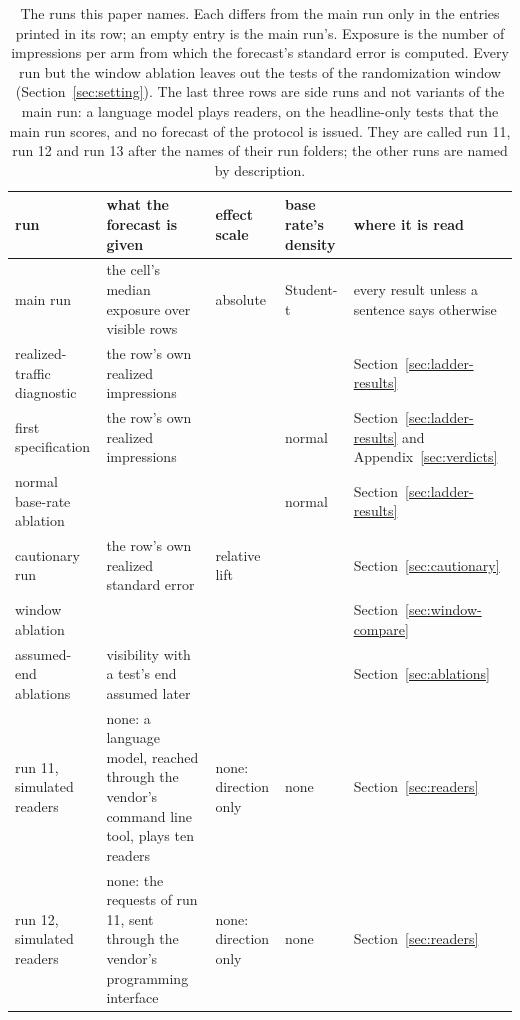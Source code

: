 \documentclass[sigconf,nonacm]{acmart}
\begin{document}
\begin{table}[t]\centering\scriptsize
\caption{The runs this paper names. Each differs from the main run only in the entries printed in its row; an empty entry is the main run's. Exposure is the number of impressions per arm from which the forecast's standard error is computed. Every run but the window ablation leaves out the tests of the randomization window (Section~\ref{sec:setting}). The last three rows are side runs and not variants of the main run: a language model plays readers, on the headline-only tests that the main run scores, and no forecast of the protocol is issued. They are called run 11, run 12 and run 13 after the names of their run folders; the other runs are named by description.}
\label{tab:fmt-runs}
\begin{tabular}{p{}p{}p{}p{}p{}}
\toprule
run & what the forecast is given & effect scale & base rate's density & where it is read \\
\midrule
main run & the cell's median exposure over visible rows & absolute & Student-t & every result unless a sentence says otherwise \\
realized-traffic diagnostic & the row's own realized impressions & & & Section~\ref{sec:ladder-results} \\
first specification & the row's own realized impressions & & normal & Section~\ref{sec:ladder-results} and Appendix~\ref{sec:verdicts} \\
normal base-rate ablation & & & normal & Section~\ref{sec:ladder-results} \\
cautionary run & the row's own realized standard error & relative lift & & Section~\ref{sec:cautionary} \\
window ablation & & & & Section~\ref{sec:window-compare} \\
assumed-end ablations & visibility with a test's end assumed later & & & Section~\ref{sec:ablations} \\
run 11, simulated readers & none: a language model, reached through the vendor's command line tool, plays ten readers & none: direction only & none & Section~\ref{sec:readers} \\
run 12, simulated readers & none: the requests of run 11, sent through the vendor's programming interface & none: direction only & none & Section~\ref{sec:readers} \\

\end{tabular}
\end{table}
\end{document}
